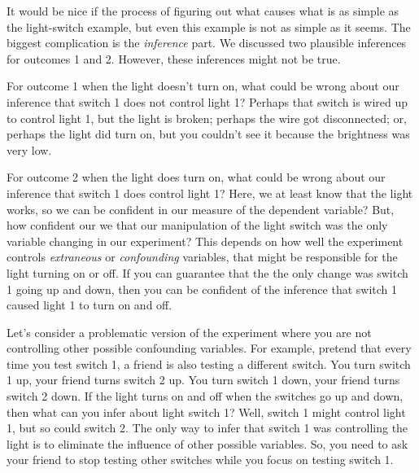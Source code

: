 It would be nice if the process of figuring out what causes what is as simple as the light-switch example, but even this example is not as simple as it seems. The biggest complication is the \emph{inference} part. We discussed two plausible inferences for outcomes 1 and 2.  However, these inferences might not be true.

For outcome 1 when the light doesn't turn on, what could be wrong about our inference that switch 1 does not control light 1? Perhaps that switch is wired up to control light 1, but the light is broken; perhaps the wire got disconnected; or, perhaps the light did turn on, but you couldn't see it because the brightness was very low.

For outcome 2 when the light does turn on, what could be wrong about our inference that switch 1 does control light 1? Here, we at least know that the light works, so we can be confident in our measure of the dependent variable? But, how confident our we that our manipulation of the light switch was the only variable changing in our experiment? This depends on how well the experiment controls \emph{extraneous} or \emph{confounding} variables, that might be responsible for the light turning on or off. If you can guarantee that the the only change was switch 1 going up and down, then you can be confident of the inference that switch 1 caused light 1 to turn on and off.

Let's consider a problematic version of the experiment where you are not controlling other possible confounding variables. For example, pretend that every time you test switch 1, a friend is also testing a different switch. You turn switch 1 up, your friend turns switch 2 up. You turn switch 1 down, your friend turns switch 2 down. If the light turns on and off when the switches go up and down, then what can you infer about light switch 1? Well, switch 1 might control light 1, but so could switch 2. The only way to infer that switch 1 was controlling the light is to eliminate the influence of other possible variables. So, you need to ask your friend to stop testing other switches while you focus on testing switch 1.

